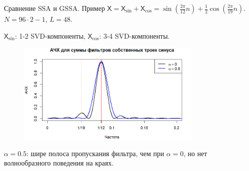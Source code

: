 \documentclass[notheorems, handout]{beamer}
\newcommand{\TS}{\mathsf{X}}
\begin{document}
	\begin{frame}{Сравнение SSA и GSSA. Пример}
		$\TS = \TS_{\sin} + \TS_{\cos} = \sin\left(\frac{2\pi}{12} n \right) + \frac{1}{2}\cos\left(\frac{2\pi}{19} n \right)$. $N = 96 \cdot 2 - 1$, $L = 48$.
		
		$\TS_{\sin}$: 1-2 SVD-компоненты, $\TS_{\cos}$: 3-4 SVD-компоненты.
		\begin{figure}[ht]
			\centering
			\includegraphics[width=0.8\textwidth]{../Text/img/various_alphas_sin_cos.png}
			\label{fig:various_alphas_sin_cos}
		\end{figure}
		\(\alpha = 0.5\): шире полоса пропускания фильтра, чем при $\alpha = 0 $, но нет волнообразного поведения на краях. 
	\end{frame}
	
\end{document}

